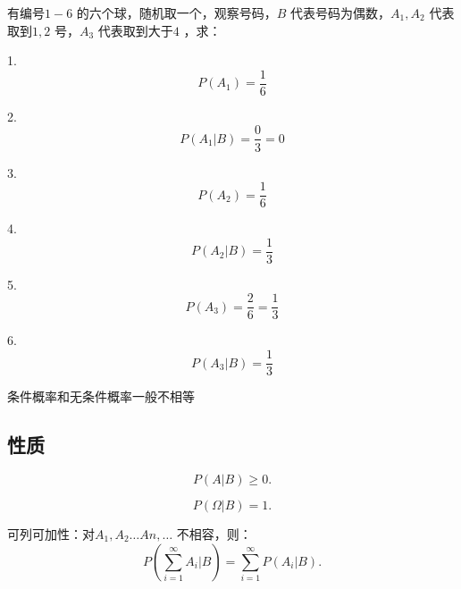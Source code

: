 \begin{eg}
    有编号$1-6$ 的六个球，随机取一个，观察号码，$B$ 代表号码为偶数，$A_1,A_2$ 代表取到$1,2$ 号，$A_3$ 代表取到大于$4$ ，求：

    1. $$P\left( A_1 \right) =\frac{1}{6}$$

    2. $$P\left( A_1|B \right) =\frac{0}{3}=0$$

    3. $$P\left( A_2 \right) =\frac{1}{6}$$

    4. $$P\left( A_2|B \right) =\frac{1}{3}$$

    5. $$P\left( A_3 \right) =\frac{2}{6}=\frac{1}{3}$$

    6. $$P\left( A_3|B \right) =\frac{1}{3}$$
    
\end{eg}

\begin{notation}
    条件概率和无条件概率一般不相等
\end{notation}

\subsection{性质}%
\label{sub:性质}
\begin{rrule}
    \[
        P\left( A|B \right) \ge 0
    .\] 
\end{rrule}
\begin{rrule}
    \[
        P\left( \Omega|B \right) =1
    .\] 
\end{rrule}
\begin{rrule}
    可列可加性：对$A_1,A_2\ldots An,\ldots$ 不相容，则：\[
    P\left( \sum_{i=1}^{\infty} A_i | B \right) =\sum_{i=1}^{\infty} P\left( A_i | B \right) 
    .\] 
\end{rrule}

